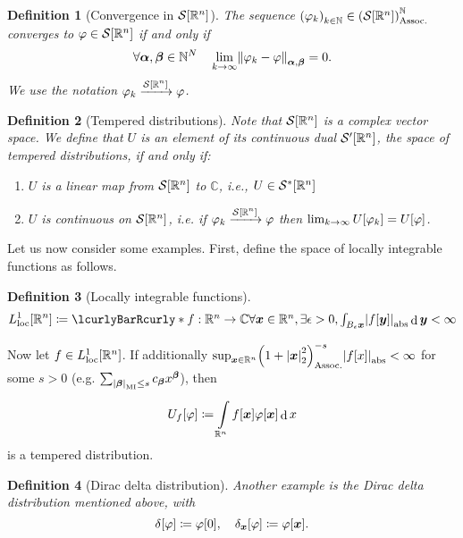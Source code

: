 \documentclass[10pt]{article}
\newtheorem*{definition}{Definition}
\DeclarePairedDelimiter\doubleBars{\Vert}{\Vert}
\DeclarePairedDelimiter\singleBars{\lvert}{\rvert}
\DeclarePairedDelimiter\parentheses{\lparen}{\rparen}
\DeclarePairedDelimiter\squareBrackets{[}{]}
\newcommand{\Dirac}[1][]{\delta_{#1}}
\DeclareMathOperator{\diffd}{d}
\newcommand{\dual}{^*}
\newcommand{\contdual}{'}
\newcommand{\N}{\mathbb{N}}
\newcommand{\R}{\mathbb{R}}
\newcommand{\C}{\mathbb{C}}
\newcommand{\Ball}[2]{B_{#1}{#2}}
\newcommand{\Lspace}[1][\infty]{L^{#1}}
\newcommand{\LspaceLoc}[1][\infty]{\Lspace[{#1}]_{\mathrm{loc}}}
\newcommand{\SchwartzSpace}{\mathcal{S}}
\newcommand\of[1]{\parentheses*{#1}}
\newcommand\pa[1]{\parentheses*{#1}}
\newcommand\abs[1]{\singleBars*{#1}}
\newcommand\norm[1]{\singleBars*{#1}}
\newcommand{\SchwartzNorm}[3]{\doubleBars*{#3}_{#1,#2}}
\newcommand\total[1]{\singleBars*{#1}}
\newcommand{\setst}[2]{\lcurlyBarRcurly*{{\textstyle #1}}{{\textstyle #2}}}
\newcommand\gj\varphi
\renewcommand\ge\epsilon
\newcommand{\vx}{{\vectorsym x}}
\newcommand{\vy}{{\vectorsym y}}
\newcommand{\miga}{{\vectorsym \alpha}}
\newcommand{\migb}{{\vectorsym \beta}}
\newcommand{\funcspec}[3]{{#1}:{#2}\rightarrow{#3}}
\newcommand{\conv}[3][]{%
\ifstrempty{#1}%
{#2 \rightarrow #3}%
{#2\xrightarrow{#1}#3}%
}
\newcommand{\tuplespec}[2]{\parentheses*{#1}_{#2}}
\renewcommand\pa[1]{\parentheses*{#1}_\mathrm{Assoc.}}
\renewcommand\of[1]{\squareBrackets*{#1}}
\renewcommand\total[1]{\singleBars*{#1}_{\mathrm{MI}}}
\renewcommand\norm[1]{\singleBars*{#1}_{2}}
\renewcommand\abs[1]{\singleBars*{#1}_{\mathrm{abs}}}
\newcommand{\Rn}{{\R^n}}
\newcommand{\Schwartz}{{\SchwartzSpace\of{\Rn}}}
\newcommand{\TemperedDistributions}{{\SchwartzSpace\contdual\of{\Rn}}}
\begin{document}
  \begin{definition}[Convergence in $\Schwartz$]
    The sequence $\tuplespec{\gj_k}{k \in \N} \in \pa\Schwartz^\N$ \emph{converges to} $\gj \in \Schwartz$ if and only if 
    \begin{equation*}
    \forall \miga, \migb \in \N^N \quad \lim_{k \rightarrow \infty}\SchwartzNorm{\miga}{\migb}{\gj_k - \gj}=0.
    \end{equation*}
    We use the notation $\conv[\Schwartz]{\gj_k}\gj$.
  \end{definition}
  \begin{definition}[Tempered distributions]
    Note that $\Schwartz$ is a complex vector space. We define that $U$ is an element of its continuous dual $\TemperedDistributions$, the space of \emph{tempered distributions}, if and only if:
    \begin{enumerate}
      \item $U$ is a linear map from $\Schwartz$ to $\C$, i.e., $U\in\SchwartzSpace\dual\of\Rn$
      \item $U$ is continuous on $\Schwartz$, i.e. if $\conv[\Schwartz]{\gj_k}\gj$ then $\lim_{\conv k \infty}U\of{\gj_k} = U\of\gj$.
    \end{enumerate}
  \end{definition}
  
  
  Let us now consider some examples. First, define the space of locally integrable functions as follows.
  \begin{definition}[Locally integrable functions]
    \begin{equation*}
      \LspaceLoc[1]\of\Rn \coloneqq \setst{\funcspec f \Rn \C}{\forall \vx \in \Rn, \exists \ge > 0, \int{\Ball \ge \vx}\abs{f\of\vy} \diffd{\vy} < \infty}
    \end{equation*}
  \end{definition}
  
  Now let $f \in {\LspaceLoc[1]}\of\Rn$.
  If additionally $\sup_{\vx \in \Rn}\pa{1 + \norm{\vx}^2}^{-s}\abs{f\of{x}} < \infty$
  for some $s > 0$ (e.g. $\sum{\total\migb\leq s} c_\migb x^\migb$),
  then 
  \begin{equation*}
    U_f\of\gj \coloneqq \int\Rn f\of{\vx} \gj\of{\vx} \diffd{x}
  \end{equation*}
  is a tempered distribution.
  \begin{definition}[Dirac delta distribution]
    Another example is the \emph{Dirac delta distribution} mentioned above, with 
    \begin{equation*}
      \Dirac\of\gj \coloneqq \gj\of{0},\quad \Dirac[\vx]\of{\gj} \coloneqq \gj\of{\vx}.
    \end{equation*}
  \end{definition}  
  
\end{document}
